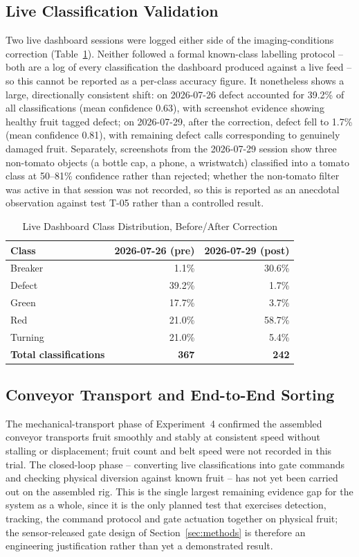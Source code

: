 \documentclass[journal]{IEEEtran}
\begin{document}
\subsection{Live Classification Validation}
\label{sec:live}
Two live dashboard sessions were logged either side of the imaging-conditions correction (Table~\ref{tab:liveclass}). Neither followed a formal known-class labelling protocol -- both are a log of every classification the dashboard produced against a live feed -- so this cannot be reported as a per-class accuracy figure. It nonetheless shows a large, directionally consistent shift: on 2026-07-26 defect accounted for 39.2\% of all classifications (mean confidence 0.63), with screenshot evidence showing healthy fruit tagged defect; on 2026-07-29, after the correction, defect fell to 1.7\% (mean confidence 0.81), with remaining defect calls corresponding to genuinely damaged fruit. Separately, screenshots from the 2026-07-29 session show three non-tomato objects (a bottle cap, a phone, a wristwatch) classified into a tomato class at 50--81\% confidence rather than rejected; whether the non-tomato filter was active in that session was not recorded, so this is reported as an anecdotal observation against test T-05 rather than a controlled result.

\begin{table}[!t]
\caption{Live Dashboard Class Distribution, Before/After Correction}
\label{tab:liveclass}
\centering
\begin{tabular}{lrr}
\toprule
\textbf{Class} & \textbf{2026-07-26 (pre)} & \textbf{2026-07-29 (post)} \\
\midrule
Breaker & 1.1\%  & 30.6\% \\
Defect  & 39.2\% & 1.7\%  \\
Green   & 17.7\% & 3.7\%  \\
Red     & 21.0\% & 58.7\% \\
Turning & 21.0\% & 5.4\%  \\
\midrule
\textbf{Total classifications} & \textbf{367} & \textbf{242} \\
\bottomrule
\end{tabular}
\end{table}

\subsection{Conveyor Transport and End-to-End Sorting}
The mechanical-transport phase of Experiment~4 confirmed the assembled conveyor transports fruit smoothly and stably at consistent speed without stalling or displacement; fruit count and belt speed were not recorded in this trial. The closed-loop phase -- converting live classifications into gate commands and checking physical diversion against known fruit -- has not yet been carried out on the assembled rig. This is the single largest remaining evidence gap for the system as a whole, since it is the only planned test that exercises detection, tracking, the command protocol and gate actuation together on physical fruit; the sensor-released gate design of Section~\ref{sec:methods} is therefore an engineering justification rather than yet a demonstrated result.
\end{document}
